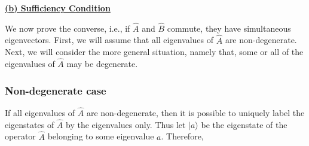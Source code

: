 \vspace{3 mm}

\noindent
{\bf {\underline {(b) Sufficiency Condition}}}

We now prove the converse, i.e., if $\hat{A}$ and $\hat{B}$ commute, they have simultaneous eigenvectors.
First, we will assume that all eigenvalues of $\hat{A}$ are non-degenerate. Next, we will consider 
the more general situation, namely that, some or all of the eigenvalues of $\hat{A}$ may be degenerate.

\subsubsection{Non-degenerate case}
If all eigenvalues of $\hat{A}$ are non-degenerate, then it is possible to uniquely label the eigenstates of $\hat{A}$ by
the eigenvalues only. Thus let $|a\rangle$ be the eigenstate of the operator $\hat{A}$ belonging to some eigenvalue $a$. Therefore,
